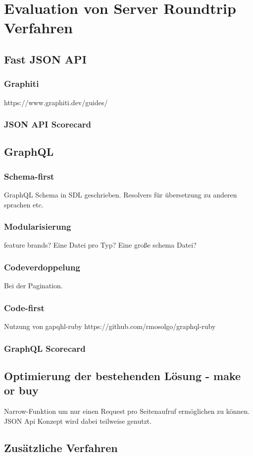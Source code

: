 \chapter{Evaluation von Server Roundtrip Verfahren}

\section{Fast JSON API}
\subsection{Graphiti}
https://www.graphiti.dev/guides/
\subsection{JSON API Scorecard}
\section{GraphQL}
\subsection{Schema-first}
GraphQL Schema in SDL geschrieben. Resolvers für übersetzung zu anderen sprachen etc.
\subsection{Modularisierung}
feature brands?
Eine Datei pro Typ?
Eine große schema Datei?
\subsection{Codeverdoppelung}
Bei der Pagination.
\subsection{Code-first}
Nutzung von gapqhl-ruby
https://github.com/rmosolgo/graphql-ruby
\subsection{GraphQL Scorecard}
\section{Optimierung der bestehenden Lösung - make or buy}
Narrow-Funktion um nur einen Request pro Seitenaufruf ermöglichen zu können. JSON Api Konzept wird dabei teilweise genutzt.
\section{Zusätzliche Verfahren}
